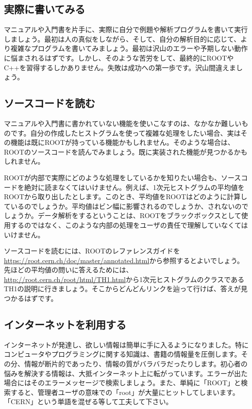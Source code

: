 \subsection{実際に書いてみる}

マニュアルや入門書を片手に、実際に自分で例題や解析プログラムを書いて実行しましょう。最初は人の真似をしながら、そして、自分の解析目的に応じて、より複雑なプログラムを書いてみましょう。最初は沢山のエラーや予期しない動作に悩まされるはずです。しかし、そのような苦労をして、最終的にROOTやC++を習得するしかありません。失敗は成功への第一歩です。沢山間違えましょう。

\subsection{ソースコードを読む}

マニュアルや入門書に書かれていない機能を使いこなすのは、なかなか難しいものです。自分の作成したヒストグラムを使って複雑な処理をしたい場合、実はその機能は既にROOTが持っている機能かもしれません。そのような場合は、ROOTのソースコードを読んでみましょう。既に実装された機能が見つかるかもしれません。

ROOTが内部で実際にどのような処理をしているかを知りたい場合も、ソースコードを絶対に読まなくてはいけません。例えば、1次元ヒストグラムの平均値をROOTから取り出したとします。このとき、平均値をROOTはどのように計算しているのでしょうか。平均値はビン幅に影響されるのでしょうか、されないのでしょうか。データ解析をするということは、ROOTをブラックボックスとして使用するのではなく、このような内部の処理をユーザの責任で理解していなくてはいけません。

ソースコードを読むには、ROOTのレファレンスガイドを\url{https://root.cern.ch/doc/master/annotated.html}から参照するとよいでしょう。先ほどの平均値の問いに答えるためには、\url{http://root.cern.ch/root/html/TH1.html}から1次元ヒストグラムのクラスであるTH1の説明に行きましょう。そこからどんどんリンクを辿って行けば、答えが見つかるはずです。

\subsection{インターネットを利用する}
インターネットが発達し、欲しい情報は簡単に手に入るようになりました。特にコンピュータやプログラミングに関する知識は、書籍の情報量を圧倒します。その分、情報が断片的であったり、情報の質がバラバラだったりします。初心者の悩みを解決する情報は、大抵インターネット上に転がっています。エラーが出た場合にはそのエラーメッセージで検索しましょう。また、単純に「ROOT」と検索すると、管理者ユーザの意味での「root」が大量にヒットしてしまいます。「CERN」という単語を混ぜる等して工夫して下さい。

